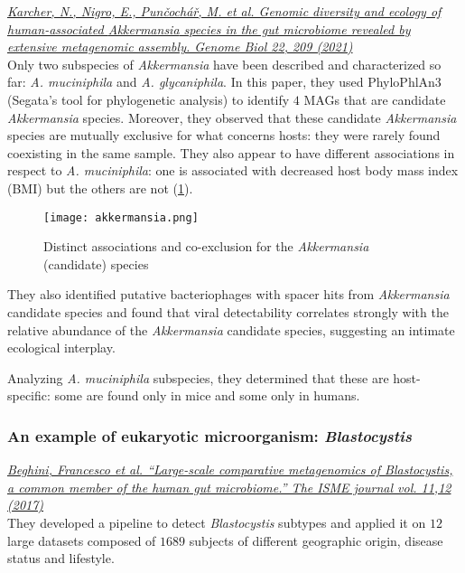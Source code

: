 \href{https://genomebiology.biomedcentral.com/articles/10.1186/s13059-021-02427-7}{\emph{Karcher, N., Nigro, E., Punčochář, M. et al. Genomic diversity and ecology of human-associated \emph{Akkermansia} species in the gut microbiome revealed by extensive metagenomic assembly. Genome Biol 22, 209 (2021)}}\\

Only two subspecies of \emph{Akkermansia} have been described and characterized so far: \emph{A. muciniphila} and \emph{A. glycaniphila}. In this paper, they used PhyloPhlAn3 (Segata’s tool for phylogenetic analysis) to identify $4$ MAGs that are candidate \emph{Akkermansia} species. 
Moreover, they observed that these candidate \emph{Akkermansia} species are mutually exclusive for what concerns hosts: they were rarely found coexisting in the same sample. They also appear to have different associations in respect to \emph{A. muciniphila}: one is associated with decreased host body mass index (BMI) but the others are not (\ref{fig:akk}).

\begin{figure}[!h]
\centering
\texttt{[image: akkermansia.png]}
\caption{\label{fig:akk}Distinct associations and co-exclusion for the \emph{Akkermansia} (candidate) species}
\end{figure}

They also identified putative bacteriophages with spacer hits from \emph{Akkermansia} candidate species and found that viral detectability correlates strongly with the relative abundance of the \emph{Akkermansia} candidate species, suggesting an intimate ecological interplay.

Analyzing \emph{A. muciniphila} subspecies, they determined that these are host-specific: some are found only in mice and some only in humans.

\subsubsection{An example of eukaryotic microorganism: \emph{Blastocystis}}

\href{https://www.nature.com/articles/ismej2017139}{\emph{Beghini, Francesco et al. “Large-scale comparative metagenomics of \emph{Blastocystis}, a common member of the human gut microbiome.” The ISME journal vol. 11,12 (2017)}}\\

They developed a pipeline to detect \emph{Blastocystis} subtypes and applied it on $12$ large datasets composed of $1689$ subjects of different geographic origin, disease status and lifestyle. 


